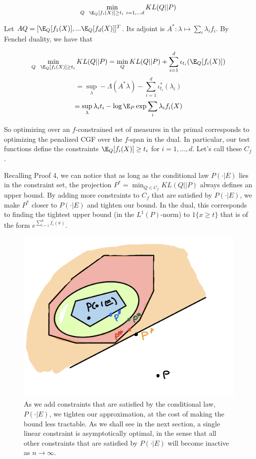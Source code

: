 \documentclass[
  letterpaper,
  DIV=11,
  numbers=noendperiod]{scrartcl}
\begin{document}
\[\min_{Q \ \ \E_Q[f_i(X)] \geq t_i \ i = 1, ... d}KL(Q || P)\]

Let \(AQ = [\E_Q[f_1(X)], ... \E_Q[f_d(X)]]^T\). Its adjoint is
\(A^*: \lambda \mapsto \sum_i \lambda_i f_i\). By Fenchel duality, we
have that

\[\min_{Q \ \ \E_Q[f_i(X)] \geq t_i}KL(Q || P) = \min_Q KL(Q || P) + \sum_{i = 1}^d\iota_{t_i}(\E_Q[f_i(X)])\]
\[= \sup_\lambda - \Lambda(A^*\lambda) - \sum_{i = 1}^d \iota^*_{t_i}(\lambda_i)\]
\[= \sup_\lambda \lambda_i t_i - \log \E_P \exp{\sum_i \lambda_i f_i(X)}\]

So optimizing over an \(f\)-constrained set of measures in the primal
corresponds to optimizing the penalized CGF over the \(f\)-span in the
dual. In particular, our test functions define the constraints
\(\E_Q[f_i(X)] \geq t_i\) for \(i = 1, ..., d\). Let's call these
\(C_f\).

Recalling Proof 4, we can notice that as long as the conditional law
\(P(\cdot | E)\) lies in the constraint set, the projection
\(P^* = \min_{Q \in C_f}KL(Q || P)\) always defines an upper bound. By
adding more constraints to \(C_f\) that are satisfied by
\(P(\cdot | E)\), we make \(P^*\) closer to \(P(\cdot | E)\) and tighten
our bound. In the dual, this corresponds to finding the tightest upper
bound (in the \(L^1(P)\)-norm) to \(1\{x \geq t\}\) that is of the form
\(e^{\sum_{i = 1}^d f_i(x)}\).

\begin{figure}[H]

{\centering \includegraphics[width=5.20833in,height=\textheight,keepaspectratio]{many_constraint_sets.png}

}

\caption{As we add constraints that are satisfied by the conditional
law, \(P(\cdot | E)\), we tighten our approximation, at the cost of
making the bound less tractable. As we shall see in the next section, a
single linear constraint is asymptotically optimal, in the sense that
all other constraints that are satisfied by \(P(\cdot | E)\) will become
inactive as \(n \to \infty\).}

\end{figure}%
\end{document}
